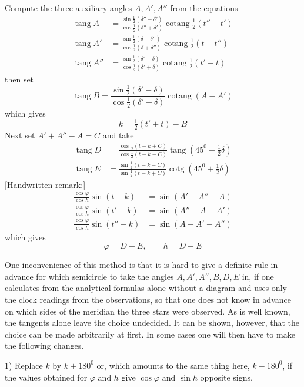 Compute the three auxiliary angles $A,A',A''$ from the equations
%
\[
\begin{aligned}
\operatorname{tang}A&=\frac{\sin\frac12(\delta''-\delta')}{\cos\frac12(\delta''+\delta')}\operatorname{cotang}\tfrac12(t''-t')\\
\operatorname{tang}A'&=\frac{\sin\frac12(\delta-\delta'')}{\cos\frac12(\delta+\delta'')}\operatorname{cotang}\tfrac12(t-t'')\\
\operatorname{tang}A''&=\frac{\sin\frac12(\delta'-\delta)}{\cos\frac12(\delta'+\delta)}\operatorname{cotang}\tfrac12(t'-t)
\end{aligned}
\]
then set
\[
\operatorname{tang}B=\frac{\sin\frac12(\delta'-\delta)}{\cos\frac12(\delta'+\delta)}\operatorname{cotang}(A-A')
\]
which gives
\[
k=\tfrac12(t'+t)-B
\]
Next set $A'+A''-A=C$ and take
\[
\begin{aligned}
\operatorname{tang}D&=\frac{\cos\frac12(t-k+C)}{\cos\frac12(t-k-C)}\operatorname{tang}(45^0+\tfrac12\delta)\\
\operatorname{tang}E&=\frac{\sin\frac12(t-k-C)}{\sin\frac12(t-k+C)}\operatorname{cotg}(45^0+\tfrac12\delta)
\end{aligned}
\]
\expandafter\def\csname HistoricalNoteText6\endcsname{[Handwritten remark:]
\[
\begin{aligned}
\frac{\cos\varphi}{\cos h}\sin(t-k)&=\sin(A'+A''-A)\\
\frac{\cos\varphi}{\cos h}\sin(t'-k)&=\sin(A''+A-A')\\
\frac{\cos\varphi}{\cos h}\sin(t''-k)&=\sin(A+A'-A'')
\end{aligned}
\]}
which gives
\[
\varphi=D+E,\qquad h=D-E
\]

One inconvenience of this method is that it is hard to give a definite rule in advance for which semicircle to take the angles $A,A',A'',B,D,E$ in, if one calculates from the analytical formulas alone without a diagram and uses only the clock readings from the observations, so that one does not know in advance on which sides of the meridian the three stars were observed. As is well known, the tangents alone leave the choice undecided. It can be shown, however, that the choice can be made arbitrarily at first. In some cases one will then have to make the following changes.

1) Replace $k$ by $k+180^0$ or, which amounts to the same thing here, $k-180^0$, if the values obtained for $\varphi$ and $h$ give $\cos\varphi$ and $\sin h$ opposite signs.
%

